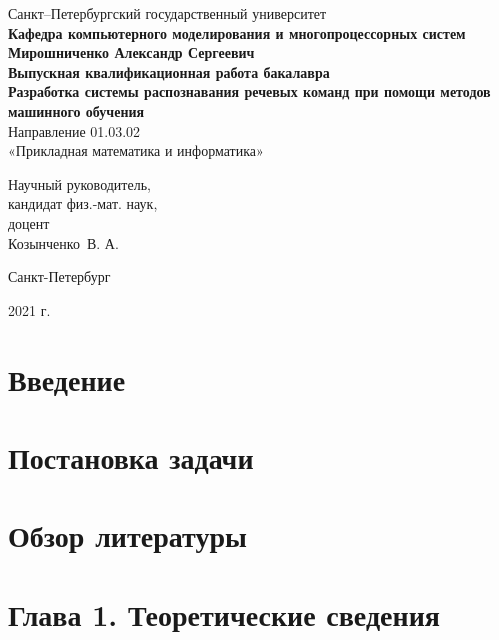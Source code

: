 \documentclass[14pt]{article}
\begin{document}
\begin{titlepage}
\begin{center}
Санкт--Петербургский государственный университет \\
\textbf{Кафедра компьютерного моделирования и многопроцессорных систем}
\vspace{55mm} \\
\textbf{\large Мирошниченко Александр Сергеевич} \\[10mm]
\textbf{\large Выпускная квалификационная работа бакалавра} \\[10mm]
\textbf{\large Разработка системы распознавания речевых команд при помощи методов машинного обучения} \\
Направление 01.03.02 \\
«Прикладная математика и информатика»\\[30mm]
\begin{flushright}
{Научный руководитель,} \\
кандидат физ.-мат. наук, \\доцент \\Козынченко~В. А. 
\end{flushright}
\vfill 
{Санкт-Петербург}
\par{2021 г.}
\end{center}
\end{titlepage}
\addtocounter{page}{1}

\tableofcontents
\newpage

\section*{Введение}
\newpage


\section*{Постановка задачи}
\newpage

\section*{Обзор литературы}
\newpage

\section*{Глава 1. Теоретические сведения}
\newpage
\end{document}
